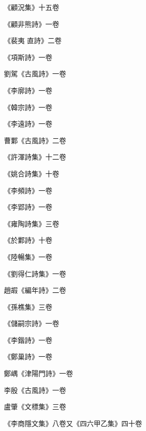 \begin{pinyinscope}
 《顧況集》十五卷



 《顧非熊詩》一卷



 《裴夷
 直詩》二卷



 《項斯詩》一卷



 劉駕《古風詩》一卷



 《李廓詩》一卷



 《韓宗詩》一卷



 《李遠詩》一卷



 曹鄴《古風詩》二卷



 《許渾詩集》十二卷



 《姚合詩集》十卷



 《李頻詩》一卷



 《李郢詩》一卷



 《雍陶詩集》三卷



 《於鄴詩》十卷



 《陸暢集》一卷



 《劉得仁詩集》一卷



 趙嘏《編年詩》二卷



 《孫樵集》三卷



 《儲嗣宗詩》一卷



 《李鍇詩》一卷



 《鄭巢詩》一卷



 鄭嵎《津陽門詩》一卷



 李殷《古風詩》一卷



 盧肇《文標集》三卷



 《李商隱文集》八卷又《四六甲乙集》四十卷




\end{pinyinscope}
